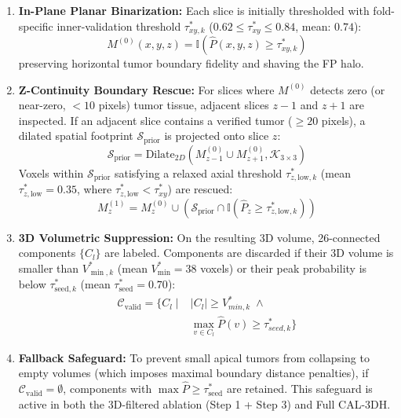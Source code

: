 \documentclass[preprint,12pt,authoryear]{elsarticle}
\begin{document}
\begin{enumerate}
    \item \textbf{In-Plane Planar Binarization:} Each slice is initially thresholded with fold-specific inner-validation threshold $\tau_{xy, k}^*$ ($0.62 \le \tau_{xy}^* \le 0.84$, mean: $0.74$):
    \begin{equation}
    M^{(0)}(x, y, z) = \mathbb{I}\left( \hat{P}(x, y, z) \ge \tau_{xy, k}^* \right)
    \end{equation}
    preserving horizontal tumor boundary fidelity and shaving the FP halo.
    \item \textbf{Z-Continuity Boundary Rescue:} For slices where $M^{(0)}$ detects zero (or near-zero, $< 10$ pixels) tumor tissue, adjacent slices $z-1$ and $z+1$ are inspected. If an adjacent slice contains a verified tumor ($\ge 20$ pixels), a dilated spatial footprint $\mathcal{S}_{\text{prior}}$ is projected onto slice $z$:
    \begin{equation}
    \mathcal{S}_{\text{prior}} = \text{Dilate}_{2D}\left(M^{(0)}_{z-1} \cup M^{(0)}_{z+1}, \mathcal{K}_{3\times 3}\right)
    \end{equation}
    Voxels within $\mathcal{S}_{\text{prior}}$ satisfying a relaxed axial threshold $\tau_{z,\mathrm{low}, k}^*$ (mean $\tau_{z,\mathrm{low}}^* = 0.35$, where $\tau_{z,\mathrm{low}}^* < \tau_{xy}^*$) are rescued:
    \begin{equation}
    M^{(1)}_z = M^{(0)}_z \cup \left( \mathcal{S}_{\text{prior}} \cap \mathbb{I}(\hat{P}_z \ge \tau_{z,\mathrm{low}, k}^*) \right)
    \end{equation}
    \item \textbf{3D Volumetric Suppression:} On the resulting 3D volume, 26-connected components $\{C_l\}$ are labeled. Components are discarded if their 3D volume is smaller than $V_{\min, k}^*$ (mean $V_{\min}^* = 38$ voxels) or their peak probability is below $\tau_{\mathrm{seed}, k}^*$ (mean $\tau_{\mathrm{seed}}^* = 0.70$):
    \begin{equation}
    \begin{aligned}
    \mathcal{C}_{\text{valid}} = \big\{ C_l \mid &|C_l| \ge V_{min, k}^* \;\land \\
    &\max_{v \in C_l} \hat{P}(v) \ge \tau_{seed, k}^* \big\}
    \end{aligned}
    \end{equation}
    \item \textbf{Fallback Safeguard:} To prevent small apical tumors from collapsing to empty volumes (which imposes maximal boundary distance penalties), if $\mathcal{C}_{\text{valid}} = \emptyset$, components with $\max \hat{P} \ge \tau_{\mathrm{seed}}^*$ are retained. This safeguard is active in both the 3D-filtered ablation (Step 1 + Step 3) and Full CAL-3DH.
\end{enumerate}
\end{document}
